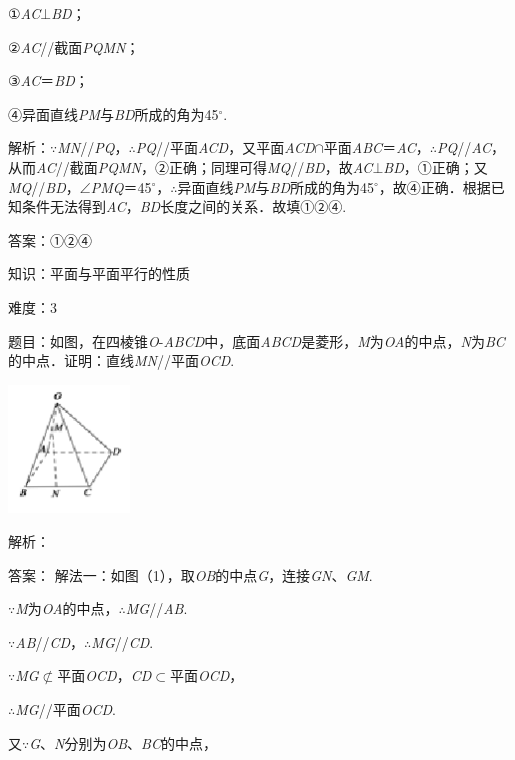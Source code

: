 \documentclass{article} %
\begin{document}
①\textit{AC}$\mathrm{\bot}$\textit{BD}；

②\textit{AC}//截面\textit{PQMN}；

③\textit{AC}＝\textit{BD}；

④异面直线\textit{PM}与\textit{BD}所成的角为45$\mathrm{{}^\circ}$.

解析：$\mathrm{\because}$\textit{MN}//\textit{PQ}，$\mathrm{\therefore}$\textit{PQ}//平面\textit{ACD}，又平面\textit{ACD}$\mathrm{\cap}$平面\textit{ABC}＝\textit{AC}，$\mathrm{\therefore}$\textit{PQ}//\textit{AC}，从而\textit{AC}//截面\textit{PQMN}，②正确；同理可得\textit{MQ}//\textit{BD}，故\textit{AC}$\mathrm{\bot}$\textit{BD}，①正确；又\textit{MQ}//\textit{BD}，$\mathrm{\angle}$\textit{PMQ}＝45$\mathrm{{}^\circ}$，$\mathrm{\therefore}$异面直线\textit{PM}与\textit{BD}所成的角为45$\mathrm{{}^\circ}$，故④正确．根据已知条件无法得到\textit{AC}，\textit{BD}长度之间的关系．故填①②④.

答案：①②④

知识：平面与平面平行的性质

难度：3

题目：如图，在四棱锥\textit{O}-\textit{ABCD}中，底面\textit{ABCD}是菱形，\textit{M}为\textit{OA}的中点，\textit{N}为\textit{BC}的中点．证明：直线\textit{MN}//平面\textit{OCD}.

\includegraphics*[width=1.27in, height=1.34in, keepaspectratio=false]{image190}

解析：

答案：
解法一：如图（1），取\textit{OB}的中点\textit{G}，连接\textit{GN}、\textit{GM}.

$\mathrm{\because}$\textit{M}为\textit{OA}的中点，$\mathrm{\therefore}$\textit{MG}//\textit{AB}.

$\mathrm{\because}$\textit{AB}//\textit{CD}，$\mathrm{\therefore}$\textit{MG}//\textit{CD}.

$\mathrm{\because}$\textit{MG}$\mathrm{\nsubset}$平面\textit{OCD}，\textit{CD}$\mathrm{\subset }$平面\textit{OCD}，

$\mathrm{\therefore}$\textit{MG}//平面\textit{OCD}.

又$\mathrm{\because}$\textit{G}、\textit{N}分别为\textit{OB}、\textit{BC}的中点，
\end{document}
